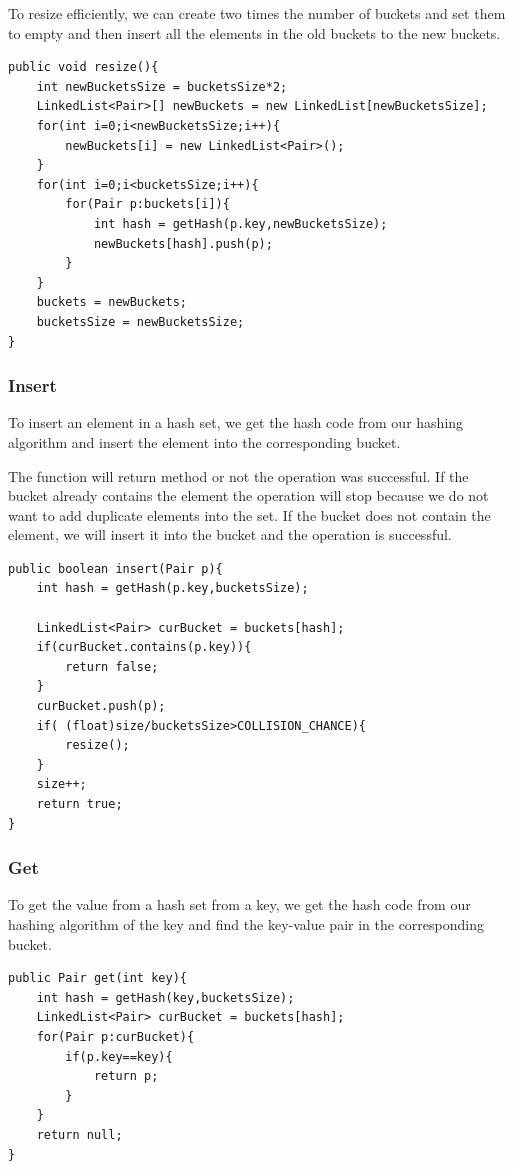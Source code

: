 \documentclass[11pt,oneside]{book}
\begin{document}
To resize efficiently, we can create two times the number of buckets and set them to empty and then insert all the elements in the old buckets to the new buckets.

\begin{lstlisting}
public void resize(){
    int newBucketsSize = bucketsSize*2;
    LinkedList<Pair>[] newBuckets = new LinkedList[newBucketsSize];
    for(int i=0;i<newBucketsSize;i++){
        newBuckets[i] = new LinkedList<Pair>();
    }
    for(int i=0;i<bucketsSize;i++){
        for(Pair p:buckets[i]){
            int hash = getHash(p.key,newBucketsSize);
            newBuckets[hash].push(p);
        }
    }
    buckets = newBuckets;
    bucketsSize = newBucketsSize;
}
\end{lstlisting}

\subsubsection{Insert}

To insert an element in a hash set, we get the hash code from our hashing algorithm and insert the element into the corresponding bucket.

The function will return method or not the operation was successful. If the bucket already contains the element the operation will stop because we do not want to add duplicate elements into the set. If the bucket does not contain the element, we will insert it into the bucket and the operation is successful.

\begin{lstlisting}
public boolean insert(Pair p){
    int hash = getHash(p.key,bucketsSize);
    
    LinkedList<Pair> curBucket = buckets[hash];
    if(curBucket.contains(p.key)){
        return false;
    }
    curBucket.push(p);
    if( (float)size/bucketsSize>COLLISION_CHANCE){
        resize();
    }
    size++;
    return true;
}
\end{lstlisting}

\subsubsection{Get}

To get the value from a hash set from a key, we get the hash code from our hashing algorithm of the key and find the key-value pair in the corresponding bucket.

\begin{lstlisting}
public Pair get(int key){
    int hash = getHash(key,bucketsSize);
    LinkedList<Pair> curBucket = buckets[hash];
    for(Pair p:curBucket){
        if(p.key==key){
            return p;
        }
    }
    return null;
}
\end{lstlisting}
\end{document}
